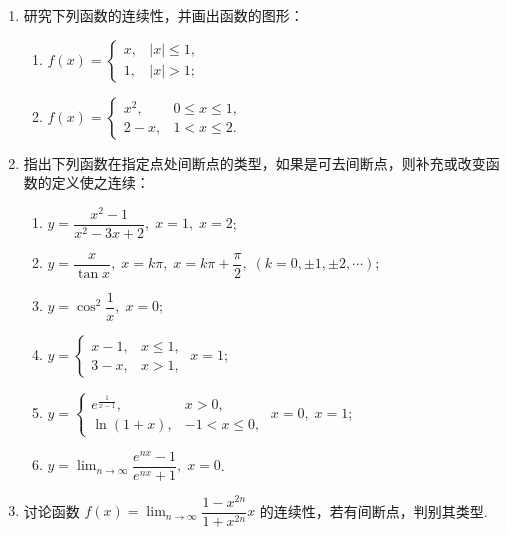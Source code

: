 \begin{enumerate}\setlength{\itemsep}{7pt}
    \item 研究下列函数的连续性，并画出函数的图形：
    \begin{enumerate}[(1)]\setlength{\itemsep}{5pt}\setlength{\topsep}{15pt}
        \item $f(x) = \begin{cases}
            x,&|x|\leqslant 1,\\
            1,&|x|>1;
        \end{cases}$
        \item $f(x)=\begin{cases}
            x^2,&0\leqslant x\leqslant 1,\\
            2-x,&1<x\leqslant2.
        \end{cases}$
    \end{enumerate}

    \item 指出下列函数在指定点处间断点的类型，如果是可去间断点，则补充或改变函数的定义使之连续：
    \begin{enumerate}[(1)]\setlength{\itemsep}{5pt}\setlength{\topsep}{15pt}
        \item $y=\dfrac{x^2-1}{x^2-3x+2},\;x=1,\;x=2$;
        \item $y=\dfrac{x}{\tan x},\;x=k\pi,\;x=k\pi+\dfrac{\pi}{2},\;(k=0,\pm1,\pm2,\cdots)$;
        \item $y=\cos^2\dfrac{1}{x},\;x=0$;
        \item $y=\begin{cases}
            x-1,&x\leqslant 1,\\
            3-x,&x> 1,
        \end{cases}\;x=1$;
        \item $y=\begin{cases}
            e^{\frac{1}{x-1}},&x>0,\\
            \ln(1+x),&-1<x\leqslant 0,
        \end{cases}\;x=0,\;x=1$;
        \item $y=\displaystyle\lim_{n\to\infty}\dfrac{e^{nx}-1}{e^{nx}+1},\;x=0$.
    \end{enumerate}

    \item 讨论函数 $f(x)=\displaystyle\lim_{n\to\infty}\dfrac{1-x^{2n}}{1+x^{2n}}x$ 的连续性，若有间断点，判别其类型. 


\end{enumerate}
